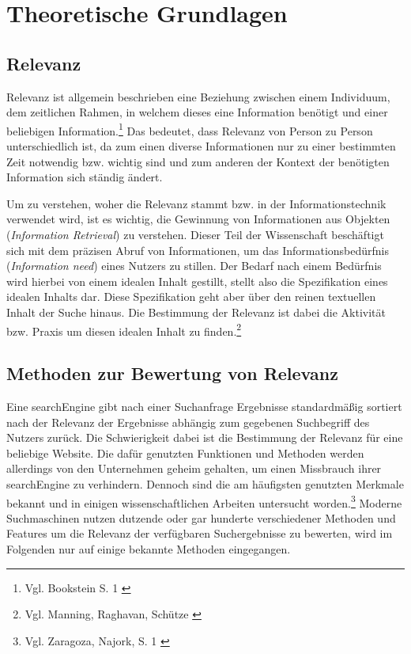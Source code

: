 \chapter{Theoretische Grundlagen}
\label{ch:grundlagen}

\section{Relevanz}

Relevanz ist allgemein beschrieben eine Beziehung zwischen einem Individuum, dem zeitlichen Rahmen, in welchem dieses eine Information benötigt und einer beliebigen Information.\footnote{Vgl. Bookstein S. 1 \cite{bookstein2007}}
Das bedeutet, dass Relevanz von Person zu Person unterschiedlich ist, da zum einen diverse Informationen nur zu einer bestimmten Zeit notwendig bzw. wichtig sind und zum anderen der Kontext der benötigten Information sich ständig ändert.

Um zu verstehen, woher die Relevanz stammt bzw. in der Informationstechnik verwendet wird, ist es wichtig, die Gewinnung von Informationen aus Objekten (\emph{Information Retrieval}) zu verstehen.
Dieser Teil der Wissenschaft beschäftigt sich mit dem präzisen Abruf von Informationen, um das Informationsbedürfnis (\emph{Information need}) eines Nutzers zu stillen.
Der Bedarf nach einem Bedürfnis wird hierbei von einem idealen Inhalt gestillt, stellt also die Spezifikation eines idealen Inhalts dar.
Diese Spezifikation geht aber über den reinen textuellen Inhalt der Suche hinaus.
Die Bestimmung der Relevanz ist dabei die Aktivität bzw. Praxis um diesen idealen Inhalt zu finden.\footnote{Vgl. Manning, Raghavan, Schütze \cite{manning2008}}

\section{Methoden zur Bewertung von Relevanz}

Eine \gls{searchEngine} gibt nach einer Suchanfrage Ergebnisse standardmäßig sortiert nach der Relevanz der Ergebnisse abhängig zum gegebenen Suchbegriff des Nutzers zurück.
Die Schwierigkeit dabei ist die Bestimmung der Relevanz für eine beliebige Website.
Die dafür genutzten Funktionen und Methoden werden allerdings von den Unternehmen geheim gehalten, um einen Missbrauch ihrer \gls{searchEngine} zu verhindern.
Dennoch sind die am häufigsten genutzten Merkmale bekannt und in einigen wissenschaftlichen Arbeiten untersucht worden.\footnote{Vgl. Zaragoza, Najork, S. 1 \cite{zaragoza2018}}
Moderne Suchmaschinen nutzen dutzende oder gar hunderte verschiedener Methoden und Features um die Relevanz der verfügbaren Suchergebnisse zu bewerten, wird im Folgenden nur auf einige bekannte Methoden eingegangen.


